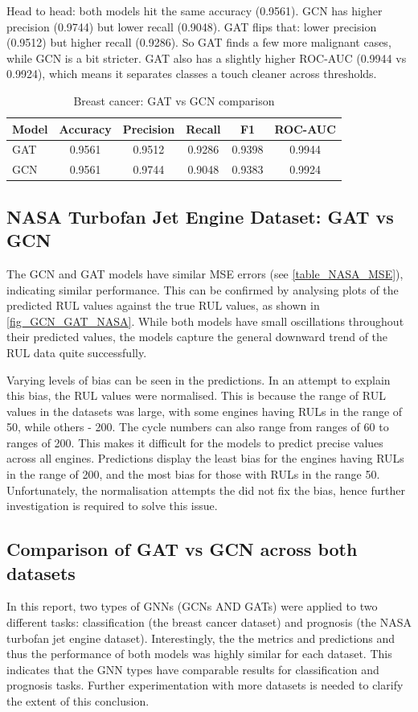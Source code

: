 \documentclass[12pt]{article}
\begin{document}
Head to head: both models hit the same accuracy (0.9561). GCN has higher precision (0.9744) but lower recall (0.9048). GAT flips that: lower precision (0.9512) but higher recall (0.9286). So GAT finds a few more malignant cases, while GCN is a bit stricter. GAT also has a slightly higher ROC-AUC (0.9944 vs 0.9924), which means it separates classes a touch cleaner across thresholds.

\begin{table}[H]
\centering
\caption{Breast cancer: GAT vs GCN comparison}
\begin{tabular}{|l|c|c|c|c|c|}
\hline
\textbf{Model} & \textbf{Accuracy} & \textbf{Precision} & \textbf{Recall} & \textbf{F1} & \textbf{ROC-AUC} \\
\hline
GAT & 0.9561 & 0.9512 & 0.9286 & 0.9398 & 0.9944 \\
GCN & 0.9561 & 0.9744 & 0.9048 & 0.9383 & 0.9924 \\
\hline
\end{tabular}

\end{table}

\subsection{NASA Turbofan Jet Engine Dataset: GAT vs GCN}
The GCN and GAT models have similar MSE errors (see \autoref{table_NASA_MSE}), indicating similar performance. This can be confirmed by analysing plots of the predicted RUL values against the true RUL values, as shown in \autoref{fig_GCN_GAT_NASA}. While both models have small oscillations throughout their predicted values, the models capture the general downward trend of the RUL data quite successfully.

Varying levels of bias can be seen in the predictions. In an attempt to explain this bias, the RUL values were normalised. This is because the range of RUL values in the datasets was large, with some engines having RULs in the range of 50, while others - 200. The cycle numbers can also range from ranges of 60 to ranges of 200. This makes it difficult for the models to predict precise values across all engines. Predictions display the least bias for the engines having RULs in the range of 200, and the most bias for those with RULs in the range 50. Unfortunately, the normalisation attempts the did not fix the bias, hence further investigation is required to solve this issue.

\subsection{Comparison of GAT vs GCN across both datasets}
In this report, two types of GNNs (GCNs AND GATs) were applied to two different tasks: classification (the breast cancer dataset) and prognosis (the NASA turbofan jet engine dataset). Interestingly, the the metrics and predictions and thus the performance of both models was highly similar for each dataset. This indicates that the GNN types have comparable results for classification and prognosis tasks. Further experimentation with more datasets is needed to clarify the extent of this conclusion.
\end{document}
